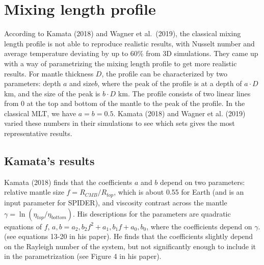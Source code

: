 \documentclass[12pt,notitlepage]{article}
\begin{document}
\section{Mixing length profile}
According to Kamata (2018) and Wagner et al.\ (2019), the classical mixing length profile is not able to reproduce realistic results, with Nusselt number and average temperature deviating by up to 60\% from 3D simulations. They came up with a way of parametrizing the mixing length profile to get more realistic results. For mantle thickness $D$, the profile can be characterized by two parameters: depth $a$ and size$b$, where the peak of the profile is at a depth of $a\cdot D$ km, and the size of the peak is $b \cdot D$ km. The profile consists of two linear lines from 0 at the top and bottom of the mantle to the peak of the profile. In the classical MLT, we have $a=b=0.5$. Kamata (2018) and Wagner et al. (2019) varied these numbers in their simulations to see which sets gives the most representative results.

\subsection{Kamata's results}
Kamata (2018) finds that the coefficients $a$ and $b$ depend on two parameters: relative mantle size $f = R_{CMB}/R_{top}$, which is about 0.55 for Earth (and is an input parameter for SPIDER), and viscosity contrast across the mantle $\gamma = \ln (\eta_{top}/\eta_{bottom})$.  His descriptions for the parameters are quadratic equations of $f$, $a,b = a_2,b_2 f^2 + a_1,b_1f + a_0,b_0$, where the coefficients depend on $\gamma$. (see equations 13-20 in his paper). He finds that the coefficients slightly depend on the Rayleigh number of the system, but not significantly enough to include it in the parametrization (see Figure 4 in his paper).
\end{document}
